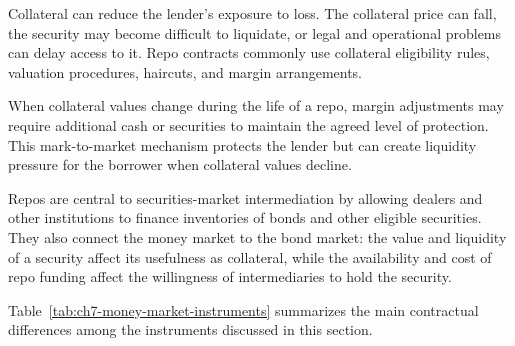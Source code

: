 Collateral can reduce the lender's exposure to loss. The collateral price can fall, the security may become difficult to liquidate, or legal and operational problems can delay access to it. Repo contracts commonly use collateral eligibility rules, valuation procedures, haircuts, and margin arrangements.

When collateral values change during the life of a repo, margin adjustments may require additional cash or securities to maintain the agreed level of protection. This mark-to-market mechanism protects the lender but can create liquidity pressure for the borrower when collateral values decline.

Repos are central to securities-market intermediation by allowing dealers and other institutions to finance inventories of bonds and other eligible securities. They also connect the money market to the bond market: the value and liquidity of a security affect its usefulness as collateral, while the availability and cost of repo funding affect the willingness of intermediaries to hold the security.

Table~\ref{tab:ch7-money-market-instruments} summarizes the main contractual differences among the instruments discussed in this section.

